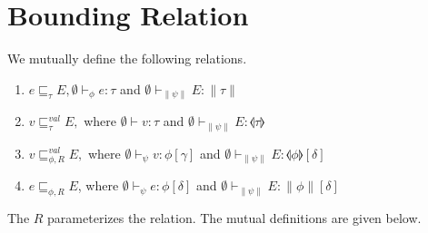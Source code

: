 \section{Bounding Relation}
%
We mutually define the following relations.
\begin{enumerate}
  \item $e \sqsubseteq_\tau E, \emptyset \vdash_\phi e : \tau$ and $\emptyset \vdash_{\|\psi\|} E : \|\tau\|$
  \item $v \sqsubseteq_\tau^{val} E, $ where $\emptyset \vdash v : \tau$ and $\emptyset \vdash_{\|\psi\|} E : \llangle \tau \rrangle$
  \item $v \sqsubseteq_{\phi,R}^{val} E, $ where $ \emptyset \vdash_\psi v : \phi[\gamma]$ and $\emptyset \vdash_{\|\psi\|} E : \llangle \phi \rrangle[\delta]$
  \item $e \sqsubseteq_{\phi,R} E$, where $\emptyset \vdash_\psi e : \phi[\delta]$ and $\emptyset \vdash_{\|\psi\|} E : \|\phi\|[\delta]$
\end{enumerate}
%
The $R$ parameterizes the relation. The mutual definitions are given below.
%
